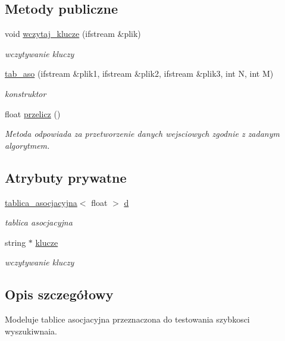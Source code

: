 \subsection*{\-Metody publiczne}
\begin{DoxyCompactItemize}
\item 
void \hyperlink{classtab__aso_ac1621845f913e272d7e1cc1938836f44}{wczytaj\-\_\-klucze} (ifstream \&plik)
\begin{DoxyCompactList}\small\item\em wczytywanie kluczy \end{DoxyCompactList}\item 
\hyperlink{classtab__aso_a93cab2f07153d409d0f448996af9b864}{tab\-\_\-aso} (ifstream \&plik1, ifstream \&plik2, ifstream \&plik3, int \-N, int \-M)
\begin{DoxyCompactList}\small\item\em konstruktor \end{DoxyCompactList}\item 
float \hyperlink{classtab__aso_a9aaf9c03908c617f51591b3fa32b4c2a}{przelicz} ()
\begin{DoxyCompactList}\small\item\em \-Metoda odpowiada za przetworzenie danych wejsciowych zgodnie z zadanym algorytmem. \end{DoxyCompactList}\end{DoxyCompactItemize}
\subsection*{\-Atrybuty prywatne}
\begin{DoxyCompactItemize}
\item 
\hyperlink{classtablica__asocjacyjna}{tablica\-\_\-asocjacyjna}$<$ float $>$ \hyperlink{classtab__aso_a5ee486c3f7635778bcb585cc655f5245}{d}
\begin{DoxyCompactList}\small\item\em tablica asocjacyjna \end{DoxyCompactList}\item 
string $\ast$ \hyperlink{classtab__aso_aa9d7d3471353afaa7585c6bbcd8e26a5}{klucze}
\begin{DoxyCompactList}\small\item\em wczytywanie kluczy \end{DoxyCompactList}\end{DoxyCompactItemize}


\subsection{\-Opis szczegółowy}
\-Modeluje tablice asocjacyjna przeznaczona do testowania szybkosci wyszukiwnaia. 

